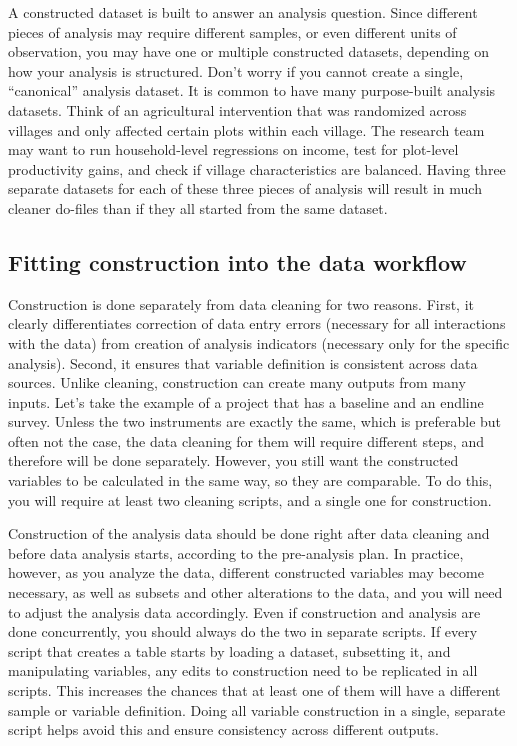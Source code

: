 A constructed dataset is built to answer an analysis question.
Since different pieces of analysis may require different samples,
or even different units of observation,
you may have one or multiple constructed datasets,
depending on how your analysis is structured.
Don't worry if you cannot create a single, ``canonical'' analysis dataset.
It is common to have many purpose-built analysis datasets.
Think of an agricultural intervention that was randomized across villages
and only affected certain plots within each village.
The research team may want to run household-level regressions on income,
test for plot-level productivity gains,
and check if village characteristics are balanced.
Having three separate datasets for each of these three pieces of analysis
will result in much cleaner do-files than if they all started from the same dataset.

\subsection{Fitting construction into the data workflow}

Construction is done separately from data cleaning for two reasons.
First, it clearly differentiates correction of data entry errors
(necessary for all interactions with the data)
from creation of analysis indicators (necessary only for the specific analysis).
Second, it ensures that variable definition is consistent across data sources.
Unlike cleaning, construction can create many outputs from many inputs.
Let's take the example of a project that has a baseline and an endline survey.
Unless the two instruments are exactly the same,
which is preferable but often not the case,
the data cleaning for them will require different steps,
and therefore will be done separately.
However, you still want the constructed variables to be calculated in the same way, so they are comparable.
To do this, you will require at least two cleaning scripts,
and a single one for construction.

Construction of the analysis data should be done right after data cleaning and before data analysis starts,
according to the pre-analysis plan.
In practice, however, as you analyze the data,
different constructed variables may become necessary,
as well as subsets and other alterations to the data,
and you will need to adjust the analysis data accordingly.
Even if construction and analysis are done concurrently,
you should always do the two in separate scripts.
If every script that creates a table starts by loading a dataset,
subsetting it, and manipulating variables,
any edits to construction need to be replicated in all scripts.
This increases the chances that at least one of them will have a different sample or variable definition.
Doing all variable construction in a single, separate script helps
avoid this and ensure consistency across different outputs.

